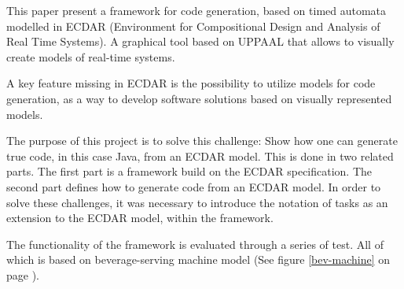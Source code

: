 This paper present a framework for code generation, based on timed automata
modelled in ECDAR (Environment for Compositional Design and Analysis of Real
Time Systems). A graphical tool based on UPPAAL that allows to visually create
models of real-time systems.

A key feature missing in ECDAR is the possibility to utilize models for code
generation, as a way to develop software solutions based on visually represented
models.

The purpose of this project is to solve this challenge: Show how one can generate true code, in this case Java, from an ECDAR model. 
This is done in two related parts. The first part is a framework build on the ECDAR specification. The second part defines how to generate code from an ECDAR model. In order to solve these challenges, it was necessary to introduce the notation of tasks as an extension to the ECDAR model, within the framework.

The functionality of the framework is evaluated through a series of test. All of
which is based on beverage-serving machine model (See figure \ref{bev-machine}
on page \pageref{bev-machine}).
